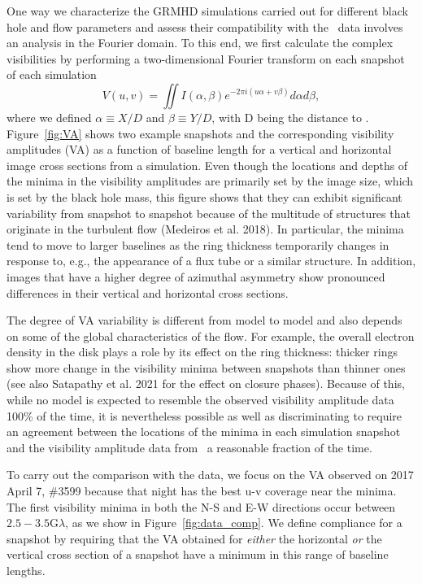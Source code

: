 One way we characterize the GRMHD simulations carried out for different
black hole and flow parameters and assess their compatibility
with the \sgra\ data involves an analysis in the Fourier domain. To this
end, we first calculate the complex visibilities by performing a
two-dimensional Fourier transform on each snapshot of each simulation
\begin{equation}
V(u,v) = \iint I(\alpha,\beta) e^{-2\pi i(u\alpha+v\beta)}d\alpha d\beta,
\end{equation}
where we defined $\alpha \equiv X/D$ and $\beta \equiv Y/D$, with D
being the distance to \sgra. Figure~\ref{fig:VA} shows two example
snapshots and the corresponding visibility amplitudes (VA) as a
function of baseline length for a vertical and horizontal image cross
sections from a simulation. Even though the locations and depths of
the minima in the visibility amplitudes are primarily set by the image
size, which is set by the black hole mass, this figure shows that they
can exhibit significant variability from snapshot to snapshot because
of the multitude of structures that originate in the turbulent flow
(Medeiros et al. 2018). In particular, the minima tend to move to
larger baselines as the ring thickness temporarily changes in response
to, e.g., the appearance of a flux tube or a similar structure. In
addition, images that have a higher degree of azimuthal asymmetry show
pronounced differences in their vertical and horizontal cross
sections.



The degree of VA variability is different from model to model and also
depends on some of the global characteristics of the flow. For
example, the overall electron density in the disk plays a role by its
effect on the ring thickness: thicker rings show more change in the
visibility minima between snapshots than thinner ones (see also
Satapathy et al. 2021 for the effect on closure phases). Because of
this, while no model is expected to resemble the observed visibility
amplitude data 100\% of the time, it is nevertheless possible as well
as discriminating to require an agreement between the locations of the
minima in each simulation snapshot and the visibility amplitude data
from \sgra\ a reasonable fraction of the time.


To carry out the comparison with the data, we focus on the VA observed
on 2017 April 7, \#3599 because that night has the best u-v coverage
near the minima. The first visibility minima in both the N-S and E-W
directions occur between $2.5-3.5$\;G$\lambda$, as we show in
Figure~\ref{fig:data_comp}. We define compliance for a snapshot by
requiring that the VA obtained for {\it either} the horizontal {\it
or} the vertical cross section of a snapshot have a minimum in this
range of baseline lengths.

